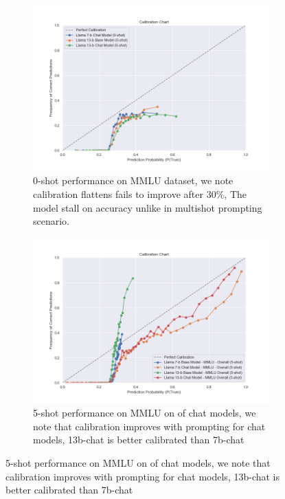 \documentclass[11pt]{article}
\begin{document}
\begin{figure}
     \centering
     \begin{subfigure}[b]{0.49\textwidth}
         \centering \includegraphics[width=1.3\textwidth]{figures/0-shot-13-b-chat-vs-13-b-hf}
         \caption{0-shot performance on MMLU dataset, we note calibration flattens fails to improve after 30\%, The model stall on accuracy unlike in multishot prompting scenario.}
         \label{fig:0-shot-MMLU}
     \end{subfigure}
     \hfill
     \begin{subfigure}[b]{0.49\textwidth}
         \centering
         \includegraphics[width=1.3\textwidth]{figures/5-shot-MMLU.png}
         \caption{5-shot performance on MMLU on of chat models, we note that calibration improves with prompting for chat models, 13b-chat is better calibrated than 7b-chat}

\end{subfigure}
\end{figure}
\end{document}
